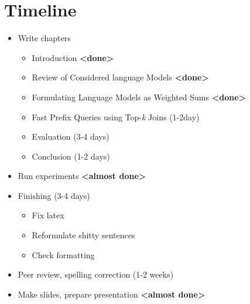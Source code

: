 \chapter{Timeline}

\begin{itemize}
  \item Write chapters
    \begin{itemize}
      \item Introduction \textbf{<done>}
      \item Review of Considered language Models \textbf{<done>}
      \item Formulating Language Models as Weighted Sums \textbf{<done>}
      \item Fast Prefix Queries using Top-\emph{k} Joins (1-2day)
      \item Evaluation (3-4 days)
      \item Conclusion (1-2 days)
    \end{itemize}
  \item Run experiments \textbf{<almost done>}
  \item Finishing (3-4 days)
    \begin{itemize}
      \item Fix latex
      \item Reformulate shitty sentences
      \item Check formatting
    \end{itemize}
  \item Peer review, spelling correction (1-2 weeks)
  \item Make slides, prepare presentation \textbf{<almost done>}
\end{itemize}
